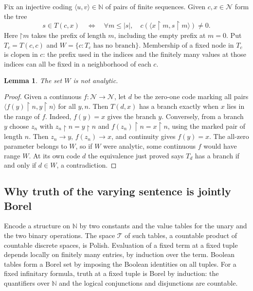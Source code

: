 \documentclass[11pt,letterpaper]{article}
\newtheorem{lemma}[theorem]{Lemma}
\theoremstyle{definition}\newtheorem{definition}[theorem]{Definition}
\newcommand{\N}{\mathbb N}
\newcommand{\Baire}{\mathcal N}
\newcommand{\card}[1]{\lvert #1\rvert}
\newcommand{\res}{\mathbin{\upharpoonright}}
\begin{document}
Fix an injective coding \(\langle u,v\rangle\in\N\) of pairs of finite
sequences. Given \(c,x\in\Baire\) form the tree
\[
 s\in T(c,x)\quad\Longleftrightarrow\quad
 \forall m\le\card{s},\quad c(\langle x\res m,s\res m\rangle)\ne0.
\]
Here \(\res m\) takes the prefix of length \(m\), including the empty
prefix at \(m=0\). Put \(T_c=T(c,c)\) and \(W=\{c:T_c\text{ has no
branch}\}\). Membership of a fixed node in \(T_c\) is clopen in \(c\):
the prefix used in the indices and the finitely many values at those
indices can all be fixed in a neighborhood of each \(c\).

\begin{lemma}\label{lem:diag}
The set \(W\) is not analytic.
\end{lemma}
\begin{proof}
Given a continuous \(f:\Baire\to\Baire\), let \(d\) be the zero-one code
marking all pairs \(\langle f(y)\res n,y\res n\rangle\) for all \(y,n\).
Then \(T(d,x)\) has a branch exactly when \(x\) lies in the range of \(f\).
Indeed, \(f(y)=x\) gives the branch \(y\). Conversely, from a branch
\(y\) choose \(z_n\) with \(z_n\res n=y\res n\) and
\(f(z_n)\res n=x\res n\), using the marked pair of length \(n\).
Then \(z_n\to y\), \(f(z_n)\to x\), and continuity gives \(f(y)=x\).
The all-zero parameter belongs to \(W\), so if \(W\) were analytic, some
continuous \(f\) would have range \(W\). At its own code \(d\) the
equivalence just proved says \(T_d\) has a branch if and only if
\(d\in W\), a contradiction.
\end{proof}

\subsection{Why truth of the varying sentence is jointly Borel}
Encode a structure on \(\N\) by two constants and the value tables for
the unary and the two binary operations. The space \(\mathcal T\) of such
tables, a countable product of countable discrete spaces, is Polish.
Evaluation of a fixed term at a fixed tuple depends locally on finitely
many entries, by induction over the term. Boolean tables form a Borel
set by imposing the Boolean identities on all tuples. For a fixed
infinitary formula, truth at a fixed tuple is Borel by induction: the
quantifiers over \(\N\) and the logical conjunctions and disjunctions are
countable.
\end{document}
